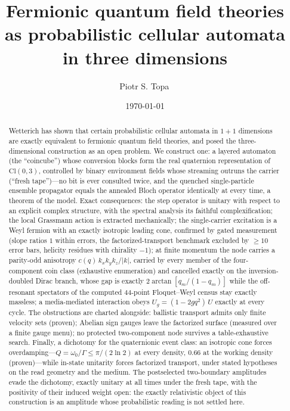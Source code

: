 \documentclass[aps,prd,twocolumn,superscriptaddress,nofootinbib,floatfix]{revtex4-2}
\begin{document}
\title{Fermionic quantum field theories as probabilistic cellular automata
in three dimensions}

\author{Piotr S. Topa\,}

\date{\today}

\begin{abstract}
Wetterich has shown that certain probabilistic cellular automata in
$1+1$ dimensions are exactly equivalent to fermionic quantum field
theories, and posed the three-dimensional construction as an open
problem. We construct one: a layered automaton (the ``coincube'') whose
conversion blocks form the real quaternion representation of
$\mathrm{Cl}(0,3)$, controlled by binary environment fields whose
streaming outruns the carrier (``fresh tape'')---no bit is ever
consulted twice, and the quenched single-particle ensemble propagator
equals the annealed Bloch operator identically at every time, a theorem
of the model. Exact consequences: the step operator is unitary with
respect to an explicit complex structure, with the spectral analysis
its faithful complexification; the local Grassmann action is extracted
mechanically; the single-carrier excitation is a Weyl fermion with an
exactly isotropic leading cone, confirmed by gated measurement (slope
ratios $1$ within errors, the factorized-transport benchmark excluded
by $\ge10$ error bars, helicity residues with chirality $-1$); at
finite momentum the node carries a parity-odd anisotropy
$c(q)\,k_xk_yk_z/|k|$, carried by every member of the four-component
coin class (exhaustive enumeration) and cancelled exactly on the
inversion-doubled Dirac
branch, whose gap is exactly $2\arctan[q_m/(1-q_m)]$ while the
off-resonant spectators of the computed 44-point Floquet--Weyl census
stay exactly massless; a media-mediated interaction obeys
$U_g=(1-2gq^2)\,U$ exactly at every cycle. The obstructions are
charted alongside: ballistic transport admits only finite velocity
sets (proven); Abelian sign gauges leave the factorized surface
(measured over a finite gauge menu); no protected two-component node
survives a table-exhaustive search. Finally, a dichotomy for the
quaternionic event class: an isotropic cone forces
overdamping---$Q=\omega_0/\Gamma\le\pi/(2\ln2)$ at every density,
$0.66$ at the working density (proven)---while in-state unitarity
forces factorized transport, under stated hypotheses on the read
geometry and the medium. The postselected two-boundary amplitudes
evade the dichotomy, exactly unitary at all times under the fresh
tape, with the positivity of their induced weight open: the exactly
relativistic object of this construction is an amplitude whose
probabilistic reading is not settled here.
\end{abstract}
\end{document}
